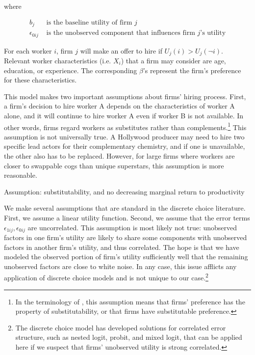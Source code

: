 where

\begin{align*}
b_j &\text{ is the baseline utility of firm $j$} \\
\epsilon_{0ij} &\text{ is the unobserved component that influences firm $j$'s utility}
\end{align*}

For each worker $i$, firm $j$ will make an offer to hire if $U_j(i) > U_j(\neg
i)$. Relevant worker characteristics (i.e. $X_i$) that a firm may consider are
age, education, or experience. The corresponding $\beta$'s represent the firm's
preference for these characteristics.

This model makes two important assumptions about firms' hiring process. First, a
firm's decision to hire worker A depends on the characteristics of worker A
alone, and it will continue to hire worker A even if worker B is not available.
In other words, firms regard workers as substitutes rather than complements.\footnote{In the terminology of \citep{Roth1992}, this assumption means
  that firms' preference has the property of substitutability, or that firms
  have substitutable preference.} This assumption is not universally true. A
Hollywood producer may need to hire two specific lead actors for their
complementary chemistry, and if one is unavailable, the other also has to be
replaced. However, for large firms where workers are closer to
swappable cogs than unique superstars, this assumption is more reasonable.


Assumption: substitutability, and no decreasing marginal return to productivity

We make several assumptions that are standard in the discrete choice literature.
First, we assume a linear utility function. Second, we assume that the error
terms $\epsilon_{1ij}, \epsilon_{0ij}$ are uncorrelated. This assumption is most
likely not true: unobserved factors in one firm's utility are likely to share
some components with unobserved factors in another firm's utility, and thus
correlated. The hope is that we have modeled the observed portion of firm's
utility sufficiently well that the remaining unobserved factors are close to
white noise. In any case, this issue afflicts any application of discrete choice
models and is not unique to our case.\footnote{The discrete choice model has
  developed solutions for correlated error structure, such as nested logit,
  probit, and mixed logit, that can be applied here if we suspect that firms'
  unobserved utility is strong correlated.} 

